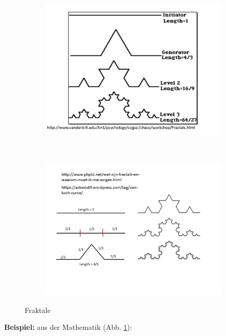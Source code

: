 \documentclass[12pt]{article}
\begin{document}
\begin{figure}[h] 
		\begin{subfigure}[h]{0.5 \textwidth}
		\centering
		\includegraphics[width=\textwidth]{Folie55.png}
		\centering
	\end{subfigure}
	~
\begin{subfigure}[h]{0.5\textwidth}
		\centering
		\includegraphics[width=\textwidth]{Folie56.png}
		\centering
	\end{subfigure}
	\caption{ Fraktale} \label{Fraktale}
\end{figure}	

\textbf{Beispiel:} aus der Mathematik (Abb. \ref{Fraktale}):
\end{document}
